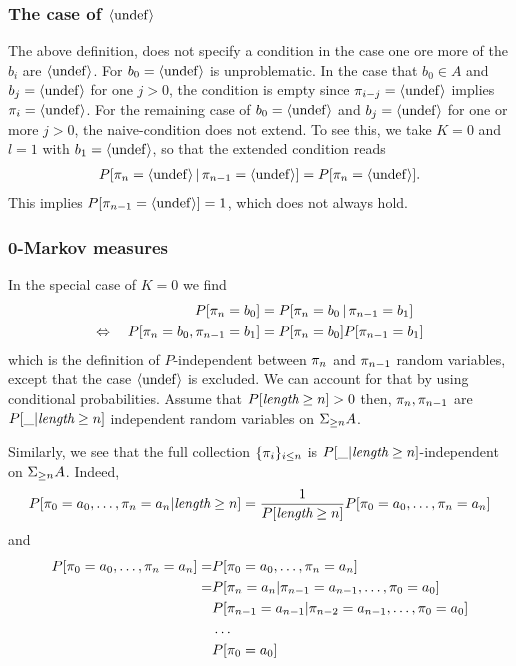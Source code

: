 \documentclass[11pt]{article}
\begin{document}
\subsubsection{The case of $\langle \mathrm{undef} \rangle$}
The above definition, does not specify a
condition in the case one ore more of the $b_i$ are $\langle \mathrm{undef} \rangle$.
For $b_0=\langle \mathrm{undef} \rangle$ is unproblematic. In the case that $b_0 \in A$ and $b_j =
\langle \mathrm{undef} \rangle$ for one $j > 0$, the condition is empty since ${\pi_{i-j}} =
\langle \mathrm{undef} \rangle$ implies ${\pi_{i}}=\langle \mathrm{undef} \rangle$. For the remaining case 
of $b_0 = \langle \mathrm{undef} \rangle$ and $b_j = \langle \mathrm{undef} \rangle$ for one or more $j > 0$,
the naive-condition does not extend. To see this, we take $K=0$ and
$l=1$ with $b_1 = \langle \mathrm{undef} \rangle$, so that the extended condition reads
\begin{align}
P[{\pi_{n}} = \langle \mathrm{undef} \rangle \,|\, {\pi_{n-1}} = \langle \mathrm{undef} \rangle ] = P[{\pi_{n}} = \langle \mathrm{undef} \rangle ].
\end{align}
This implies $P[{\pi_{n-1}} = \langle \mathrm{undef} \rangle] = 1$, which does not always hold.

\subsubsection{0-Markov measures}
In the special case of $K=0$ we find
\begin{align*}
  P[{\pi_{n}} = b_0 ] &= P[ {\pi_{n}} = b_0 \,|\, {\pi_{n-1}} = b_1] \\
  \Leftrightarrow \quad P[ {\pi_{n}} = b_0,  {\pi_{n-1}} = b_1 ] 
                   &= P[ {\pi_{n}} = b_0 ] P[{\pi_{n-1}} = b_1 ]
\end{align*}
which is the definition of $P$-independent between ${\pi_{n}}$ and
${\pi_{n-1}}$ random variables, except that the case $\langle \mathrm{undef} \rangle$ is
excluded. We can account for that by using conditional probabilities.
Assume that $P[\text{\it length} \geq n] > 0$ then, ${\pi_{n}}, {\pi_{n-1}}$ are
$P[\_|\text{\it length} \geq n]$ independent random variables on $\Sigma_{\geq n} A$.

Similarly, we see that the full collection $\{ {\pi_{i}} \}_{i \leq n}$ 
is $P[\_|\text{\it length} \geq n]$-independent on $\Sigma_{\geq n} A$. Indeed, 
\[     P[ {\pi_{0}} = a_0, \dots, {\pi_{n}} = a_n | \text{\it length} \geq n]
  = \frac{1}{P[\text{\it length} \geq n]} P[ {\pi_{0}} = a_0, \dots, {\pi_{n}} = a_n ] \]
and
\begin{align*}
 P[ {\pi_{0}} = a_0, \dots, {\pi_{n}} = a_n] = &P[ {\pi_{0}} = a_0, \dots, {\pi_{n}} = a_n ] \\
  = & P[ {\pi_{n}} = a_n     | {\pi_{n-1}}=a_{n-1}, \dots, {\pi_{0}} = a_0 ]  \\
    & P[{\pi_{n-1}} = a_{n-1}| {\pi_{n-2}}=a_{n-1}, \dots, {\pi_{0}} = a_0 ]  \\
    & \dots \\
    & P[{\pi_{0}} = a_{0}]
\end{align*}
\end{document}
